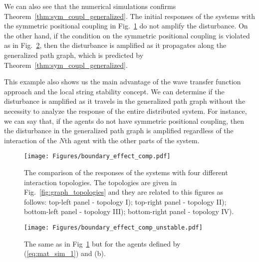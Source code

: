 \documentclass[10pt,twocolumn,twoside]{IEEEtran}
\theoremstyle{definition}
\newcommand{\revA}{Black}
\begin{document}
{\color{\revA}We can also see that the numerical simulations confirms Theorem~\ref{thm:sym_coupl_generalized}. The initial responses of the systems with the symmetric positional coupling in Fig.~\ref{fig:boundary_effect_comp} do not amplify the disturbance. On the other hand, if the condition on the symmetric positional coupling is violated as in Fig.~\ref{fig:boundary_effect_comp_unstable}, then the disturbance is amplified as it propagates along the generalized path graph, which is predicted by Theorem~\ref{thm:sym_coupl_generalized}.

This example also shows us the main advantage of the wave transfer function approach and the local string stability concept. We can determine if the disturbance is amplified as it travels in the generalized path graph without the necessity to analyze the response of the entire distributed system. For instance, we can say that, if the agents do not have symmetric positional coupling, then the disturbance in the generalized path graph is amplified regardless of the interaction of the $N$th agent with the other parts of the system.}









\begin{figure}[ht]
 \centering
  \texttt{[image: Figures/boundary\_effect\_comp.pdf]}
  \caption{The comparison of the responses of the systems with four different interaction topologies. The topologies are given in Fig.~\ref{fig:graph_topologies} and they are related to this figures as follows: top-left panel - topology I); top-right panel - topology II); bottom-left panel - topology III); bottom-right panel - topology IV).}
  \label{fig:boundary_effect_comp}
\end{figure}

\begin{figure}[ht]
 \centering
  \texttt{[image: Figures/boundary\_effect\_comp\_unstable.pdf]}
  \caption{{\color{\revA}The same as in Fig~\ref{fig:boundary_effect_comp} but for the agents defined by (\ref{eq:mat_sim_1}) and (b).}}
  \label{fig:boundary_effect_comp_unstable}
\end{figure}
\end{document}

